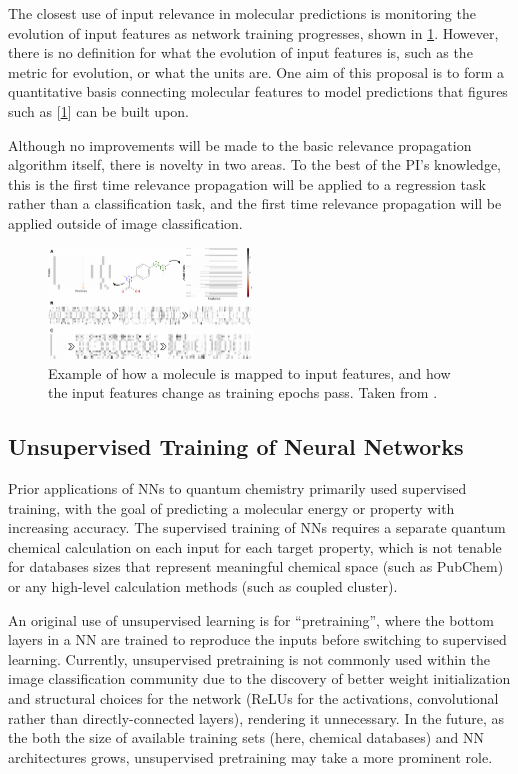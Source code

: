 \documentclass[12pt]{article}
\begin{document}
The closest use of input relevance in molecular predictions is monitoring the evolution of input features as network training progresses\cite{Kearnes2016}, shown in \ref{fig:org5dd0d4b}. However, there is no definition for what the evolution of input features is, such as the metric for evolution, or what the units are. One aim of this proposal is to form a quantitative basis connecting molecular features to model predictions that figures such as [\ref{fig:org5dd0d4b}] can be built upon.

Although no improvements will be made to the basic relevance propagation algorithm itself, there is novelty in two areas. To the best of the PI's knowledge, this is the first time relevance propagation will be applied to a regression task rather than a classification task, and the first time relevance propagation will be applied outside of image classification.

\begin{figure}
\centering
\includegraphics[width=0.48\textwidth]{10822_2016_9938_Fig8_HTML.png}
\caption{\label{fig:org5dd0d4b}
Example of how a molecule is mapped to input features, and how the input features change as training epochs pass. Taken from \parencite{Kearnes2016}.}
\end{figure}

\subsection{Unsupervised Training of Neural Networks}
\label{sec:org354d341}

Prior applications of NNs to quantum chemistry primarily used supervised training, with the goal of predicting a molecular energy or property with increasing accuracy. The supervised training of NNs requires a separate quantum chemical calculation on each input for each target property, which is not tenable for databases sizes that represent meaningful chemical space (such as PubChem\cite{doi:10.1021/acs.jcim.7b00083}) or any high-level calculation methods (such as coupled cluster).

An original use of unsupervised learning is for ``pretraining'', where the bottom layers in a NN are trained to reproduce the inputs before switching to supervised learning. Currently, unsupervised pretraining is not commonly used within the image classification community due to the discovery of better weight initialization and structural choices for the network (ReLUs for the activations, convolutional rather than directly-connected layers), rendering it unnecessary. In the future, as the both the size of available training sets (here, chemical databases) and NN architectures grows, unsupervised pretraining may take a more prominent role.
\end{document}
